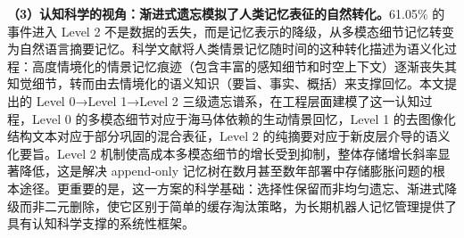 \textbf{（3）认知科学的视角：渐进式遗忘模拟了人类记忆表征的自然转化。}61.05\% 的事件进入 Level 2 不是数据的丢失，而是记忆表示的降级，从多模态细节记忆转变为自然语言摘要记忆。科学文献将人类情景记忆随时间的这种转化描述为语义化过程\cite{winocur2011memory}：高度情境化的情景记忆痕迹（包含丰富的感知细节和时空上下文）逐渐丧失其知觉细节，转而由去情境化的语义知识（要旨、事实、概括）来支撑回忆。本文提出的 Level 0→Level 1→Level 2 三级遗忘谱系，在工程层面建模了这一认知过程，Level 0 的多模态细节对应于海马体依赖的生动情景回忆，Level 1 的去图像化结构文本对应于部分巩固的混合表征，Level 2 的纯摘要对应于新皮层介导的语义化要旨。Level 2 机制使高成本多模态细节的增长受到抑制，整体存储增长斜率显著降低，这是解决 append-only 记忆树在数月甚至数年部署中存储膨胀问题的根本途径。更重要的是，这一方案的科学基础：选择性保留而非均匀遗忘、渐进式降级而非二元删除，使它区别于简单的缓存淘汰策略，为长期机器人记忆管理提供了具有认知科学支撑的系统性框架。

